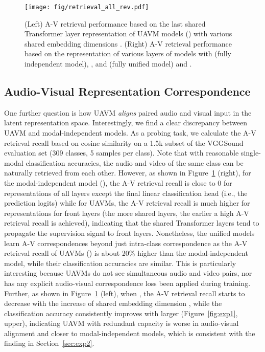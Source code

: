 \documentclass[journal]{IEEEtran}
\newcommand{\squeezeup}{\vspace{-1.6mm}}
\newcommand{\rev}[1]{{\color{dblue} #1}}
\begin{document}
\begin{figure}[]
\centering
\texttt{[image: fig/retrieval\_all\_rev.pdf]}
\vspace{-1.0em}
\caption{(Left) A-V retrieval performance based on the last shared Transformer layer representation of UAVM models () with various shared embedding dimensions . (Right) A-V retrieval performance based on the representation of various layers of models with  (fully independent model), , and  (fully unified model) and .}
\label{fig:exp3}
\vspace{-1.2em}
\end{figure}

\squeezeup\squeezeup
\subsection{Audio-Visual Representation Correspondence}

\rev{One further question is how UAVM \emph{aligns} paired audio and visual input in the latent representation space. Interestingly, we find a clear discrepancy between UAVM and modal-independent models.}
As a probing task, we calculate the A-V retrieval recall based on cosine similarity on a 1.5k subset of the VGGSound evaluation set (309 classes, 5 samples per class). 
Note that with reasonable single-modal classification accuracies, the audio and video of the same class can be naturally retrieved from each other. However, as shown in Figure~\ref{fig:exp3} (right), for the modal-independent model (), the A-V retrieval recall is close to 0 for representations of all layers except the final linear classification head (i.e., the prediction logits) while for UAVMs, the A-V retrieval recall is much higher for representations for front layers (the more shared layers, the earlier a high A-V retrieval recall is achieved), indicating that the shared Transformer layers \rev{tend to} propagate the supervision signal to front layers. \rev{Nonetheless, the unified models learn A-V correspondences beyond just intra-class correspondence as the A-V retrieval recall of UAVMs () is about 20\% higher than the modal-independent model, while their classification accuracies are similar. This is particularly interesting because UAVMs do not see simultaneous audio and video pairs, nor has any explicit audio-visual correspondence loss been applied during training. 
Further, as shown in Figure~\ref{fig:exp3} (left), when , the A-V retrieval recall starts to decrease with the increase of shared embedding dimension , while the classification accuracy consistently improves with larger  (Figure~\ref{fig:exp1}, upper), indicating UAVM with redundant capacity is worse in audio-visual alignment and closer to modal-independent models, which is consistent with the finding in Section~\ref{sec:exp2}.
}
\end{document}
